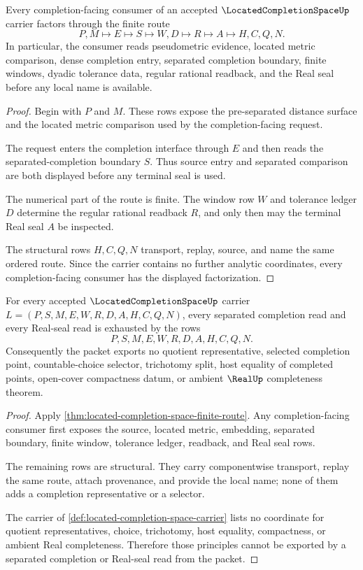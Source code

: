 \begin{theorem}
\label{thm:located-completion-space-finite-route}
Every completion-facing consumer of an accepted $\LocatedCompletionSpaceUp$ carrier factors through the finite route
$$
P,M\longmapsto E\longmapsto S\longmapsto W,D\longmapsto R\longmapsto A\longmapsto H,C,Q,N .
$$
In particular, the consumer reads pseudometric evidence, located metric comparison, dense completion entry, separated completion boundary, finite windows, dyadic tolerance data, regular rational readback, and the Real seal before any local name is available.
\end{theorem}
\begin{proof}
Begin with $P$ and $M$. These rows expose the pre-separated distance surface and the located metric comparison used by the completion-facing request.

The request enters the completion interface through $E$ and then reads the separated-completion boundary $S$. Thus source entry and separated comparison are both displayed before any terminal seal is used.

The numerical part of the route is finite. The window row $W$ and tolerance ledger $D$ determine the regular rational readback $R$, and only then may the terminal Real seal $A$ be inspected.

The structural rows $H,C,Q,N$ transport, replay, source, and name the same ordered route. Since the carrier contains no further analytic coordinates, every completion-facing consumer has the displayed factorization.
\end{proof}

\begin{theorem}
\label{thm:located-completion-space-representative-refusal}
For every accepted $\LocatedCompletionSpaceUp$ carrier $L=(P,S,M,E,W,R,D,A,H,C,Q,N)$, every separated completion read and every Real-seal read is exhausted by the rows
$$
P,S,M,E,W,R,D,A,H,C,Q,N .
$$
Consequently the packet exports no quotient representative, selected completion point, countable-choice selector, trichotomy split, host equality of completed points, open-cover compactness datum, or ambient $\RealUp$ completeness theorem.
\end{theorem}
\begin{proof}
Apply \autoref{thm:located-completion-space-finite-route}. Any completion-facing consumer first exposes the source, located metric, embedding, separated boundary, finite window, tolerance ledger, readback, and Real seal rows.

The remaining rows are structural. They carry componentwise transport, replay the same route, attach provenance, and provide the local name; none of them adds a completion representative or a selector.

The carrier of \autoref{def:located-completion-space-carrier} lists no coordinate for quotient representatives, choice, trichotomy, host equality, compactness, or ambient Real completeness. Therefore those principles cannot be exported by a separated completion or Real-seal read from the packet.
\end{proof}

